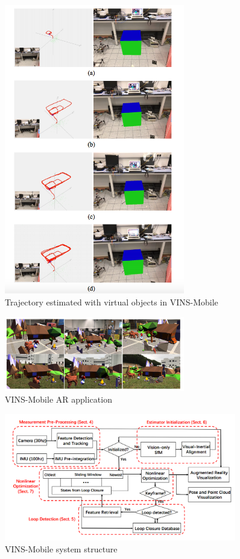 \documentclass[12pt,twoside]{article}
\begin{document}
\begin{figure}[h]
    \centering
    \includegraphics[width=0.7\textwidth]{figures/vin1}
    \caption{Trajectory estimated with virtual objects in VINS-Mobile}
    \label{fig: vin1}
\end{figure}

\begin{figure}[h]
    \centering
    \includegraphics[width=0.7\textwidth]{figures/vin2}
    \caption{VINS-Mobile AR application}
    \label{fig: vin2}
\end{figure}


\begin{figure}[h]
    \centering
    \includegraphics[width=0.9\textwidth]{figures/vin3}
    \caption{VINS-Mobile system structure}
    \label{fig: vin3}
\end{figure}
\end{document}
